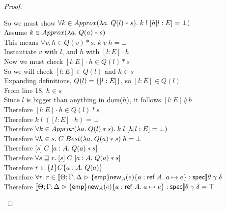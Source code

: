\begin{proof}
\begin{tabbedproof}
    \oooooo So we must show $\forall k \in Approx(\lambda a.\;Q(l)*s).\;k\;l\;[h|l:E] = \bot)$ \\
    \oooooo Assume $k \in Approx(\lambda a.\;Q(a)*s)$ \\
    \ooooooo This means $\forall v, h \in Q(v)*s.\; k\;v\;h = \bot$ \\
    \ooooooo Instantiate $v$ with $l$, and $h$ with $[l:E]\cdot h$ \\
    \ooooooo Now we must check $[l:E]\cdot h \in Q(l) * s$ \\
    \ooooooo So we will check $[l:E] \in Q(l)$ and $h \in s$ \\
    \ooooooo Expanding definitions, $Q(l) = \{{[l:E]}\}$, so $[l:E] \in Q(l)$ \\
    \ooooooo From line 18, $h \in s$ \\
    \ooooooo Since $l$ is bigger than anything in $\mbox{dom}({h})$, it follows $[l:E] \# h$ \\
    \ooooooo Therefore $[l:E]\cdot h \in Q(l) * s$ \\
    \ooooooo Therefore $k\;l\;([l:E]\cdot h) = \bot$ \\
    \oooooo Therefore $\forall k \in Approx(\lambda a.\;Q(l)*s).\;k\;l\;[h|l:E] = \bot)$ \\
    \ooooo Therefore $\forall h \in s.\; C\;Best(\lambda a.\;Q(a)*s)\;h = \bot$ \\
    \ooooo Therefore $[{s}]\;{C}\;[{a:A}.\;{Q(a)*s}]$ \\
    \oooo Therefore $\forall s \sqsupseteq r.\; [{s}]\;{C}\;[{a:A}.\;{Q(a)*s}]$ \\
    \oooo Therefore $r \in \{{I}\}{C}\{{a:A}.\;{Q(a)}\}$ \\
    \ooo Therefore $\forall r.\; r \in [\![{{\Theta; \Gamma; \Delta} \vartriangleright {\{{\mathsf{emp}}\}{\mathsf{new}_{A}(e)}\{{a:\mathsf{ref}\;A}.\;{a \mapsto e}\}} : \mathsf{spec}}]\!]\theta\;\gamma\;\delta$ \\
    \ooo Therefore $[\![{{\Theta; \Gamma; \Delta} \vartriangleright {\{{\mathsf{emp}}\}{\mathsf{new}_{A}(e)}\{{a:\mathsf{ref}\;A}.\;{a \mapsto e}\}} : \mathsf{spec}}]\!]\theta\;\gamma\;\delta = \top$ \\
  \end{tabbedproof}
\end{proof}

